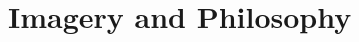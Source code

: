 \documentclass[12pt,a4paper]{book}
\begin{document}
\part{Imagery and Philosophy}

% 

% 

% 

\appendix



% 

% 

% 

% 

% 



% 



\end{document}
